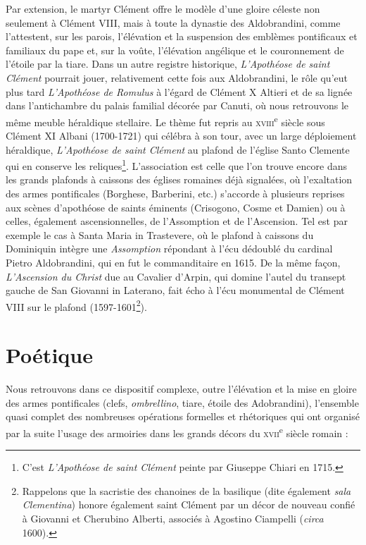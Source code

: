 \documentclass[12pt,twoside,openany]{book}
\begin{document}
Par extension, le martyr Clément offre le modèle d’une gloire céleste non seulement à Clément VIII, mais à toute la dynastie des Aldobrandini, comme l’attestent, sur les parois, l’élévation et la suspension des emblèmes pontificaux et familiaux du pape et, sur la voûte, l’élévation angélique et le couronnement de l’étoile par la tiare. Dans un autre registre historique, \textit{L’Apothéose de saint Clément }pourrait jouer, relativement cette fois aux Aldobrandini, le rôle qu’eut plus tard \textit{L’Apothéose de Romulus} à l’égard de Clément X Altieri et de sa lignée dans l’antichambre du palais familial décorée par Canuti, où nous retrouvons le même meuble héraldique stellaire. Le thème fut repris au \textsc{xviii}\textsuperscript{e} siècle sous Clément XI Albani (1700-1721) qui célébra à son tour, avec un large déploiement héraldique, \textit{L’Apothéose de saint Clément} au plafond de l’église Santo Clemente qui en conserve les reliques\footnote{C’est \textit{L’Apothéose de saint Clément} peinte par Giuseppe Chiari en 1715.}. L’association est celle que l’on trouve encore dans les grands plafonds à caissons des églises romaines déjà signalées, où l’exaltation des armes pontificales (Borghese, Barberini, etc.) s’accorde à plusieurs reprises aux scènes d’apothéose de saints éminents (Crisogono, Cosme et Damien) ou à celles, également ascensionnelles, de l’Assomption et de l’Ascension. Tel est par exemple le cas à Santa Maria in Trastevere, où le plafond à caissons du Dominiquin intègre une \textit{Assomption} répondant à l’écu dédoublé du cardinal Pietro Aldobrandini, qui en fut le commanditaire en 1615. De la même façon, \textit{L’Ascension du Christ} due au Cavalier d’Arpin, qui domine l’autel du transept gauche de San Giovanni in Laterano, fait écho à l’écu monumental de Clément VIII sur le plafond (1597-1601\footnote{Rappelons que la sacristie des chanoines de la basilique (dite également \textit{sala Clementina}) honore également saint Clément par un décor de nouveau confié à Giovanni et Cherubino Alberti, associés à Agostino Ciampelli (\textit{circa} 1600).}).

\section{Poétique}

Nous retrouvons dans ce dispositif complexe, outre l’élévation et la mise en gloire des armes pontificales (clefs, \textit{ombrellino}, tiare, étoile des Adobrandini), l’ensemble quasi complet des nombreuses opérations formelles et rhétoriques qui ont organisé par la suite l’usage des armoiries dans les grands décors du \textsc{xvii}\textsuperscript{e} siècle romain :
\end{document}
